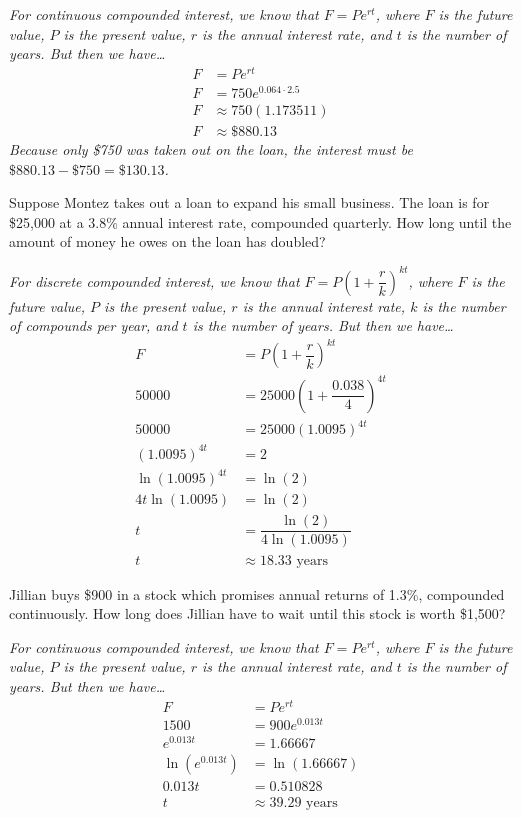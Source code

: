\documentclass[12pt,letterpaper]{exam}
\begin{document}
\begin{questions}
{\itshape For continuous compounded interest, we know that $F= P e^{rt}$, where $F$ is the future value, $P$ is the present value, $r$ is the annual interest rate, and $t$ is the number of years. But then we have\dots \pspace
	\[
	\begin{aligned}
	F&= P e^{rt} \\[0.5cm]
	F&= 750 e^{0.064 \cdot 2.5} \\[0.5cm]
	F&\approx 750 (1.173511) \\[0.5cm]
	F&\approx \$880.13
	\end{aligned}
	\] \pspace
Because only \$750 was taken out on the loan, the interest must be $\$880.13 - \$750= \$130.13$.
}



\newpage
\question[10] Suppose Montez takes out a loan to expand his small business. The loan is for \$25,000 at a 3.8\% annual interest rate, compounded quarterly. How long until the amount of money he owes on the loan has doubled? \pvspace{1.5cm}

{\itshape For discrete compounded interest, we know that $F= P \left(1 + \dfrac{r}{k} \right)^{kt}$, where $F$ is the future value, $P$ is the present value, $r$ is the annual interest rate, $k$ is the number of compounds per year, and $t$ is the number of years. But then we have\dots \pspace
	\[
	\begin{aligned}
	F&= P \left(1 + \dfrac{r}{k} \right)^{kt} \\[0.5cm]
	50000&= 25000 \left(1 + \dfrac{0.038}{4} \right)^{4t} \\[0.5cm]
	50000&= 25000 (1.0095)^{4t} \\[0.5cm]
	(1.0095)^{4t}&= 2 \\[0.5cm]
	\ln(1.0095)^{4t}&= \ln(2) \\[0.5cm]
	4t \ln(1.0095)&= \ln(2) \\[0.5cm]
	t&= \dfrac{\ln(2)}{4 \ln(1.0095)} \\[0.5cm]
	t&\approx 18.33 \text{ years}
	\end{aligned}
	\]
}



\newpage
\question[10] Jillian buys \$900 in a stock which promises annual returns of 1.3\%, compounded continuously. How long does Jillian have to wait until this stock is worth \$1,500? \pvspace{1.5cm}

{\itshape For continuous compounded interest, we know that $F= P e^{rt}$, where $F$ is the future value, $P$ is the present value, $r$ is the annual interest rate, and $t$ is the number of years. But then we have\dots \pspace
	\[
	\begin{aligned}
	F&= P e^{rt} \\[0.5cm]
	1500&= 900 e^{0.013t} \\[0.5cm]
	e^{0.013t}&= 1.66667 \\[0.5cm]
	\ln(e^{0.013t})&= \ln(1.66667) \\[0.5cm]
	0.013t&= 0.510828 \\[0.5cm]
	t&\approx 39.29 \text{ years}
	\end{aligned}
	\] \pspace
}


\end{questions}
\end{document}
